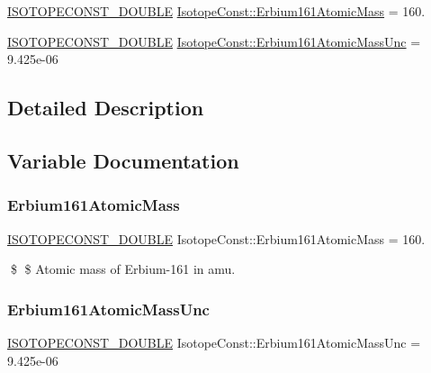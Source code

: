 \begin{DoxyCompactItemize}
\item 
\mbox{\hyperlink{group___isotope_const-_macros_ga8f45a7272ce02c0b4c65c44636ed719a}{I\+S\+O\+T\+O\+P\+E\+C\+O\+N\+S\+T\+\_\+\+D\+O\+U\+B\+LE}} \mbox{\hyperlink{group___isotope_const-_erbium-_er161_ga763eea411fed272716270acd5430729d}{Isotope\+Const\+::\+Erbium161\+Atomic\+Mass}} = 160.
\item 
\mbox{\hyperlink{group___isotope_const-_macros_ga8f45a7272ce02c0b4c65c44636ed719a}{I\+S\+O\+T\+O\+P\+E\+C\+O\+N\+S\+T\+\_\+\+D\+O\+U\+B\+LE}} \mbox{\hyperlink{group___isotope_const-_erbium-_er161_gacdb9fe436d297c263bb4884506d7c7d3}{Isotope\+Const\+::\+Erbium161\+Atomic\+Mass\+Unc}} = 9.\+425e-\/06
\end{DoxyCompactItemize}


\subsection{Detailed Description}


\subsection{Variable Documentation}
\mbox{\label{group___isotope_const-_erbium-_er161_ga763eea411fed272716270acd5430729d}} 
\subsubsection{\texorpdfstring{Erbium161\+Atomic\+Mass}{Erbium161AtomicMass}}
{\footnotesize\ttfamily \mbox{\hyperlink{group___isotope_const-_macros_ga8f45a7272ce02c0b4c65c44636ed719a}{I\+S\+O\+T\+O\+P\+E\+C\+O\+N\+S\+T\+\_\+\+D\+O\+U\+B\+LE}} Isotope\+Const\+::\+Erbium161\+Atomic\+Mass = 160.}

\$ \$ Atomic mass of Erbium-\/161 in amu. \mbox{\label{group___isotope_const-_erbium-_er161_gacdb9fe436d297c263bb4884506d7c7d3}} 
\subsubsection{\texorpdfstring{Erbium161\+Atomic\+Mass\+Unc}{Erbium161AtomicMassUnc}}
{\footnotesize\ttfamily \mbox{\hyperlink{group___isotope_const-_macros_ga8f45a7272ce02c0b4c65c44636ed719a}{I\+S\+O\+T\+O\+P\+E\+C\+O\+N\+S\+T\+\_\+\+D\+O\+U\+B\+LE}} Isotope\+Const\+::\+Erbium161\+Atomic\+Mass\+Unc = 9.\+425e-\/06}

